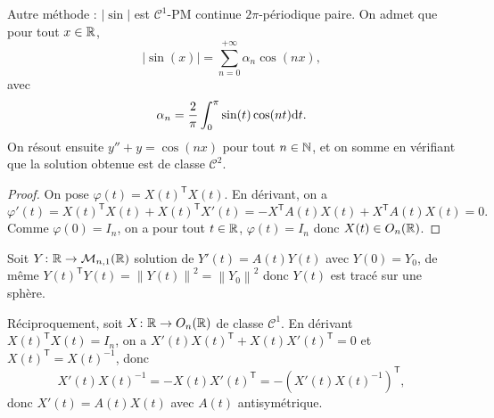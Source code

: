 \documentclass[12pt]{article}
\begin{document}
\begin{remark}
	Autre méthode : $\left\lvert\sin\right\rvert$ est $\mathcal{C}^{1}$-PM continue $2\pi$-périodique paire. On admet que pour tout $x\in\mathbb{R}$, 
	\begin{equation}
		\left\lvert\sin(x)\right\rvert=\sum_{n=0}^{+\infty}\alpha_n \cos(nx),
	\end{equation}
	avec 
	\begin{equation}
		\alpha_n=\frac{2}{\pi}\int_{0}^{\pi}\sin(t)\cos(nt)\mathrm{d} t.
	\end{equation}
	On résout ensuite $y''+y=\cos(nx)$ pour tout $n\in\mathbb{N}$, et on somme en vérifiant que la solution obtenue est de classe $\mathcal{C}^{2}$.
\end{remark}

\begin{proof}
	On pose $\varphi(t)=X(t)^{\mathsf{T}}X(t)$. En dérivant, on a 
	\begin{equation}
		\varphi'(t)=X(t)^{\mathsf{T}}X(t)+X(t)^{\mathsf{T}}X'(t)=-X^{\mathsf{T}}A(t)X(t)+X^{\mathsf{T}}A(t)X(t)=0.
	\end{equation}
	Comme $\varphi(0)=I_n$, on a pour tout $t\in\mathbb{R}$, $\varphi(t)=I_n$ donc $X(t)\in O_n(\mathbb{R})$.
\end{proof}

\begin{remark}
	Soit $Y\colon \mathbb{R}\to\mathcal{M}_{n,1}(\mathbb{R})$ solution de $Y'(t)=A(t)Y(t)$ avec $Y(0)=Y_0$, de même $Y(t)^{ \mathsf{T}}Y(t)=\left\lVert Y(t)\right\rVert^{2}=\left\lVert Y_0\right\rVert^{2}$ donc $Y(t)$ est tracé sur une sphère.
\end{remark}

\begin{remark}
	Réciproquement, soit $X\colon\mathbb{R}\to O_n(\mathbb{R})$ de classe $\mathcal{C}^{1}$. En dérivant $X(t)^{\mathsf{T}}X(t)=I_n$, on a $X'(t)X(t)^{\mathsf{T}}+X(t)X'(t)^{\mathsf{T}}=0$ et $X(t)^{\mathsf{T}}=X(t)^{-1}$, donc 
	\begin{equation}
		X'(t)X(t)^{-1}=-X(t)X'(t)^{\mathsf{T}}=-(X'(t)X(t)^{-1})^{\mathsf{T}},
	\end{equation}
	donc $X'(t)=A(t)X(t)$ avec $A(t)$ antisymétrique.
\end{remark}
\end{document}
